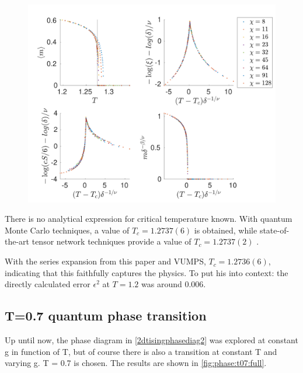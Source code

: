 \begin{figure}[H]
    \center
    \includegraphics[width=\textwidth]{Figuren/phasediag/g25/zoomed.pdf}
    \caption{  }
    \label{fig:phase:g25:zoomed}
\end{figure}

There is no analytical expression for critical temperature known. With quantum Monte Carlo techniques, a value of $T_c=1.2737(6)$ is obtained, while state-of-the-art tensor network techniques provide a value of $T_c=1.2737(2)$ \cite{Czarnik2019}.

With the series expansion from this paper and VUMPS, $T_c=1.2736(6)$, indicating that this faithfully captures the physics. To put his into context: the directly calculated error $\epsilon^{2}$  at $T=1.2$ was around $0.006$.

\subsection{T=0.7 quantum phase transition}\label{tphasetranssubsec}

Up until now, the phase diagram in \cref{2dtisingphasediag2} was explored at constant g in function of T, but of course there is also a transition at constant T and varying g.  T = 0.7 is chosen. The results are shown in \cref{fig:phase:t07:full}.

